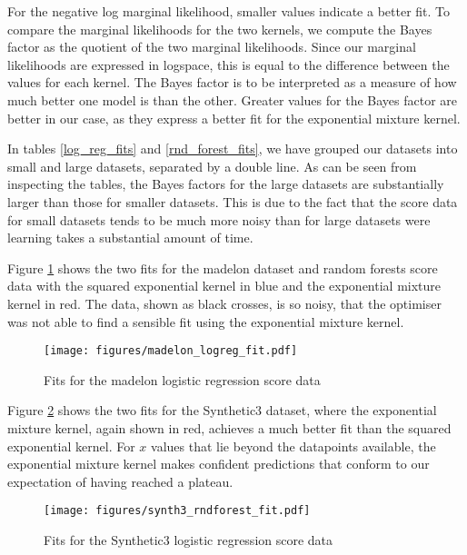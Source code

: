 \documentclass[a4paper,12pt,twoside,openright]{report}
\begin{document}
For the negative log marginal likelihood, smaller values indicate a better fit. To compare the marginal likelihoods for the two kernels, we compute the Bayes factor as the quotient of the two marginal likelihoods. Since our marginal likelihoods are expressed in logspace, this is equal to the difference between the values for each kernel. The Bayes factor is to be interpreted as a measure of how much better one model is than the other. Greater values for the Bayes factor are better in our case, as they express a better fit for the exponential mixture kernel.

In tables \ref{log_reg_fits} and \ref{rnd_forest_fits}, we have grouped our datasets into small and large datasets, separated by a double line. As can be seen from inspecting the tables, the Bayes factors for the large datasets are substantially larger than those for smaller datasets. This is due to the fact that the score data for small datasets tends to be much more noisy than for large datasets were learning takes a substantial amount of time.

Figure \ref{madelon_logreg_fit} shows the two fits for the madelon dataset and random forests score data with the squared exponential kernel in blue and the exponential mixture kernel in red. The data, shown as black crosses, is so noisy, that the optimiser was not able to find a sensible fit using the exponential mixture kernel.

\begin{figure}
\centering
  \texttt{[image: figures/madelon\_logreg\_fit.pdf]}
  \caption{Fits for the madelon logistic regression score data}
  \label{madelon_logreg_fit}
\end{figure}

Figure \ref{synth3_rndforest_fit} shows the two fits for the Synthetic3 dataset, where the exponential mixture kernel, again shown in red, achieves a much better fit than the squared exponential kernel. For $x$ values that lie beyond the datapoints available, the exponential mixture kernel makes confident predictions that conform to our expectation of having reached a plateau.

\begin{figure}
\centering
  \texttt{[image: figures/synth3\_rndforest\_fit.pdf]}
  \caption{Fits for the Synthetic3 logistic regression score data}
  \label{synth3_rndforest_fit}
\end{figure}
\end{document}
